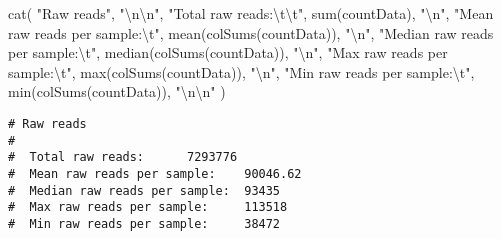 \documentclass[
]{article}
\newenvironment{Shaded}{\begin{snugshade}}{\end{snugshade}}
\newcommand{\FunctionTok}[1]{\textcolor[rgb]{0.00,0.00,0.00}{#1}}
\newcommand{\NormalTok}[1]{#1}
\newcommand{\SpecialCharTok}[1]{\textcolor[rgb]{0.00,0.00,0.00}{#1}}
\newcommand{\StringTok}[1]{\textcolor[rgb]{0.31,0.60,0.02}{#1}}
\begin{document}
\begin{Shaded}
\begin{Highlighting}[]
\FunctionTok{cat}\NormalTok{(}
  \StringTok{"Raw reads"}\NormalTok{, }\StringTok{"}\SpecialCharTok{\textbackslash{}n\textbackslash{}n}\StringTok{"}\NormalTok{,}
  \StringTok{"Total raw reads:}\SpecialCharTok{\textbackslash{}t\textbackslash{}t}\StringTok{"}\NormalTok{, }\FunctionTok{sum}\NormalTok{(countData), }\StringTok{"}\SpecialCharTok{\textbackslash{}n}\StringTok{"}\NormalTok{,}
  \StringTok{"Mean raw reads per sample:}\SpecialCharTok{\textbackslash{}t}\StringTok{"}\NormalTok{, }\FunctionTok{mean}\NormalTok{(}\FunctionTok{colSums}\NormalTok{(countData)), }\StringTok{"}\SpecialCharTok{\textbackslash{}n}\StringTok{"}\NormalTok{,}
  \StringTok{"Median raw reads per sample:}\SpecialCharTok{\textbackslash{}t}\StringTok{"}\NormalTok{, }\FunctionTok{median}\NormalTok{(}\FunctionTok{colSums}\NormalTok{(countData)), }\StringTok{"}\SpecialCharTok{\textbackslash{}n}\StringTok{"}\NormalTok{,}
  \StringTok{"Max raw reads per sample:}\SpecialCharTok{\textbackslash{}t}\StringTok{"}\NormalTok{, }\FunctionTok{max}\NormalTok{(}\FunctionTok{colSums}\NormalTok{(countData)), }\StringTok{"}\SpecialCharTok{\textbackslash{}n}\StringTok{"}\NormalTok{,}
  \StringTok{"Min raw reads per sample:}\SpecialCharTok{\textbackslash{}t}\StringTok{"}\NormalTok{, }\FunctionTok{min}\NormalTok{(}\FunctionTok{colSums}\NormalTok{(countData)), }\StringTok{"}\SpecialCharTok{\textbackslash{}n\textbackslash{}n}\StringTok{"}
\NormalTok{)}
\end{Highlighting}
\end{Shaded}

\begin{verbatim}
# Raw reads 
# 
#  Total raw reads:      7293776 
#  Mean raw reads per sample:    90046.62 
#  Median raw reads per sample:  93435 
#  Max raw reads per sample:     113518 
#  Min raw reads per sample:     38472
\end{verbatim}
\end{document}
